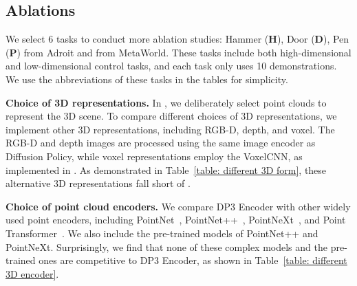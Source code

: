 \subsection{Ablations}
We select 6 tasks to conduct more ablation studies: Hammer (\textbf{H}), Door (\textbf{D}), Pen (\textbf{P}) from Adroit and  from MetaWorld. These tasks include both high-dimensional and low-dimensional control tasks, and each task only uses 10 demonstrations. We use the abbreviations of these tasks in the tables for simplicity.
 



% 




\textbf{Choice of 3D representations.} 
In \ours, we deliberately select point clouds to represent the 3D scene. To compare different choices of 3D representations,  we implement other 3D representations, including RGB-D, depth, and voxel.  The RGB-D and depth images are processed using the same image encoder as Diffusion Policy, while voxel representations employ the VoxelCNN, as implemented in \citep{chen2023visual_dex}. As demonstrated in Table~\ref{table: different 3D form}, these alternative 3D representations fall short of \ours. 








\textbf{Choice of point cloud encoders.} We compare DP3 Encoder with other widely used point encoders, including PointNet~\citep{qi2017pointnet},  PointNet++~\citep{qi2017pointnet++}, PointNeXt~\citep{qian2022pointnext}, and Point Transformer~\citep{zhao2021point_transformer}. We also include the pre-trained models of PointNet++ and PointNeXt. Surprisingly, we find that none of these complex models and the pre-trained ones are competitive to DP3 Encoder, as shown in Table~\ref{table: different 3D encoder}.

